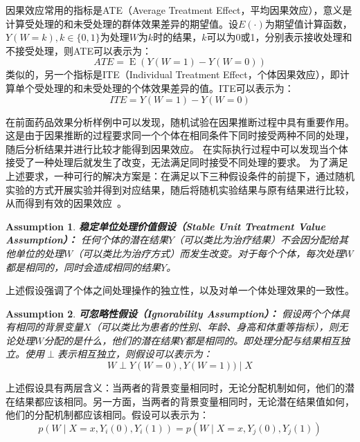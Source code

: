 \documentclass[algorithmlist, AutoFakeBold, AutoFakeSlant, figurelist, tablelist, nomlist, engineering]{seuthesix}
\begin{document}
因果效应常用的指标是ATE（Average Treatment Effect，平均因果效应），意义是计算受处理的和未受处理的群体效果差异的期望值。设$E(\cdot)$为期望值计算函数，$Y(W=k), k \in \{0, 1\}$为处理$W$为$k$时的结果，$k$可以为0或1，分别表示接收处理和不接受处理，则ATE可以表示为：
\begin{equation}
  ATE=\operatorname{E}\left(Y(W=1) - Y(W=0)\right)
  \label{equation_ATE}
\end{equation}
类似的，另一个指标是ITE（Individual Treatment Effect，个体因果效应），即计算单个受处理的和未受处理的个体效果差异的值。ITE可以表示为：
\begin{equation}
  ITE=Y(W=1) - Y(W=0)
  \label{equation_ITE}
\end{equation}

在前面药品效果分析样例中可以发现，随机试验在因果推断过程中具有重要作用。
这是由于因果推断的过程要求同一个个体在相同条件下同时接受两种不同的处理，随后分析结果并进行比较才能得到因果效应。
在实际执行过程中可以发现当个体接受了一种处理后就发生了改变，无法满足同时接受不同处理的要求。
为了满足上述要求，一种可行的解决方案是：在满足以下三种假设条件的前提下，通过随机实验的方式开展实验并得到对应结果，随后将随机实验结果与原有结果进行比较，从而得到有效的因果效应~\cite{yao2021survey}。

\newtheorem{assumption}{Assumption}[section]
\begin{assumption}
  \textbf{稳定单位处理价值假设（Stable Unit Treatment Value Assumption）：}
  任何个体的潜在结果$Y$（可以类比为治疗结果）不会因分配给其他单位的处理$W$（可以类比为治疗方式）而发生改变。对于每个个体，每次处理$W$都是相同的，同时会造成相同的结果$Y$。
  \label{1_Assumption}
\end{assumption}
上述假设强调了个体之间处理操作的独立性，以及对单一个体处理效果的一致性。

\begin{assumption}
  \textbf{可忽略性假设（Ignorability Assumption）：}
  假设两个个体具有相同的背景变量$X$（可以类比为患者的性别、年龄、身高和体重等指标），则无论处理$W$分配的是什么，他们的潜在结果$Y$都是相同的。即处理分配与结果相互独立。使用$\perp$表示相互独立，则假设可以表示为：
  \begin{equation}
    W \perp Y(W=0), Y(W=1)) \mid X
  \end{equation}
  \label{2_Assumption}
\end{assumption}
上述假设具有两层含义：当两者的背景变量相同时，无论分配机制如何，他们的潜在结果都应该相同。另一方面，当两者的背景变量相同时，无论潜在结果值如何，他们的分配机制都应该相同。假设可以表示为：
\begin{equation}
  p\left(W \mid X=x, Y_i(0), Y_i(1)\right)=p\left(W \mid X=x, Y_j(0), Y_j(1)\right)
\end{equation}
\end{document}
